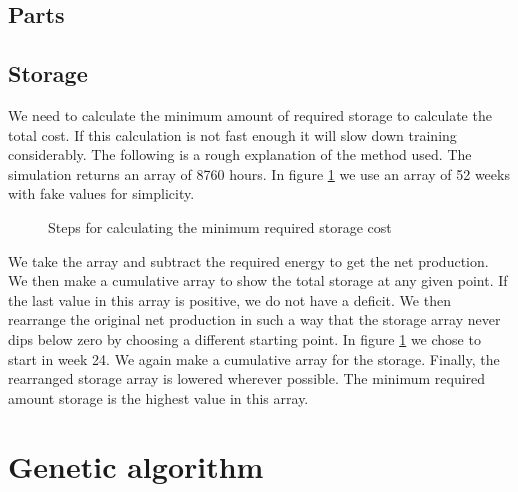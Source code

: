 \documentclass[12pt]{article}
\begin{document}
\subsection{Parts}

\subsection{Storage}

We need to calculate the minimum amount of required storage to calculate the total cost. If this calculation is not fast enough it will slow down training considerably. The following is a rough explanation of the method used. The simulation returns an array of 8760 hours. In figure \ref{fig:storage} we use an array of 52 weeks with fake values for simplicity.

\begin{figure}[h!]
\caption{\label{fig:storage} Steps for calculating the minimum required storage cost}
\end{figure}

We take the array and subtract the required energy to get the net production. We then make a cumulative array to show the total storage at any given point. If the last value in this array is positive, we do not have a deficit. We then rearrange the original net production in such a way that the storage array never dips below zero by choosing a different starting point. In figure \ref{fig:storage} we chose to start in week 24. We again make a cumulative array for the storage. Finally, the rearranged storage array is lowered wherever possible. The minimum required amount storage is the highest value in this array.

\section{Genetic algorithm}
\end{document}
